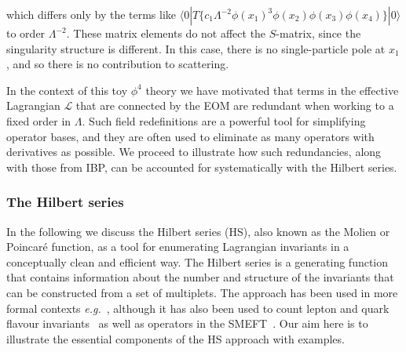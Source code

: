 which differs only by the terms like
$\langle 0 | T \{ c_{1} \Lambda^{-2} \phi(x_{1})^{3} \phi(x_{2}) \phi(x_{3}) \phi(x_{4}) \} | 0 \rangle$
to order $\Lambda^{-2}$. These matrix elements do not affect the $S$-matrix,
since the singularity structure is different. In this case, there is no
single-particle pole at $x_{1}$, and so there is no contribution to scattering.

In the context of this toy $\phi^{4}$ theory we have motivated that terms in the
effective Lagrangian $\mathscr{L}$ that are connected by the EOM are redundant
when working to a fixed order in $\Lambda$. Such field redefinitions are a
powerful tool for simplifying operator bases, and they are often used to
eliminate as many operators with derivatives as possible. We proceed to
illustrate how such redundancies, along with those from IBP, can be accounted
for systematically with the Hilbert series.

\subsubsection{The Hilbert series}

In the following we discuss the Hilbert series (HS), also known as the Molien or
Poincar\'{e} function, as a tool for enumerating Lagrangian invariants in a
conceptually clean and efficient way. The Hilbert series is a generating
function that contains information about the number and structure of the
invariants that can be constructed from a set of multiplets. The approach has
been used in more formal contexts \textit{e.g.}~\cite{Pouliot:1998yv,
  Benvenuti:2006qr, Dolan:2007rq}, although it has also been used to count
lepton and quark flavour invariants~\cite{Hanany:2010vu, Jenkins:2009dy} as well
as operators in the SMEFT~\cite{Henning:2015alf}. Our aim here is to illustrate
the essential components of the HS approach with examples.


